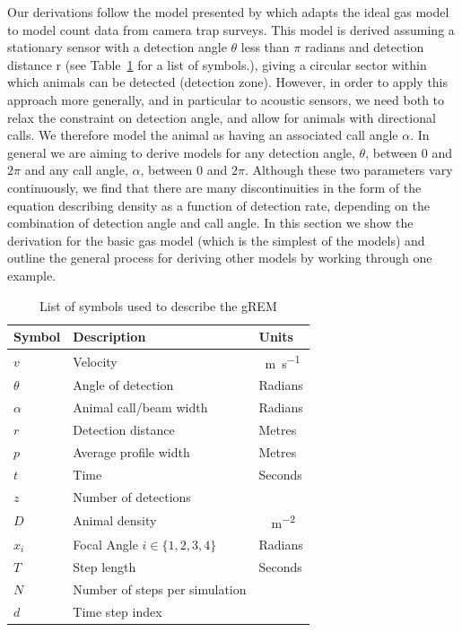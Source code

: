\documentclass[a4paper,10pt,reqno,oneside]{amsart}
\begin{document}
Our derivations follow the model presented by \cite{rowcliffe2008estimating} which adapts the ideal gas model to model count data from camera trap surveys. This model is derived assuming a stationary sensor with a detection angle $\theta$ less than $\pi$ radians and detection distance r (see Table~\ref{t:paras} for a list of symbols.), giving a circular sector within which animals can be detected (detection zone). However, in order to apply this approach more generally, and in particular to acoustic sensors, we need both to relax the constraint on detection angle, and allow for animals with directional calls. We therefore model the animal as having an associated call angle $\alpha$. In general we are aiming to derive models for any detection angle, $ \theta$, between 0 and $2\pi$ and any call angle, $ \alpha$, between 0 and $2\pi$. Although these two parameters vary continuously, we find that there are many discontinuities in the form of the equation describing density as a function of detection rate, depending on the combination of detection angle and call angle. In this section we show the derivation for the basic gas model (which is the simplest of the models) and outline the general process for deriving other models by working through one example. 



\begin{table}[t]
\centering
\begin{tabular}{lll}
Symbol 	& Description & Units\\\hline
$v$		& Velocity & \SI{}{\meter\per\second}\\
$\theta$	& Angle of detection & Radians \\
$\alpha$	& Animal call/beam width & Radians \\
$r$ 		& Detection distance & Metres\\
$p$ 		& Average profile width & Metres\\
$t$		& Time & Seconds\\
$z$		& Number of detections & \\
$D$		& Animal density & \SI{}{\animals\per\meter\squared} \\
$x_i$	        & Focal Angle $i \in \{1,2,3,4\} $ 	& Radians\\
$T$ 		& Step length & Seconds\\
$N$ 		& Number of steps per simulation & \\
$d$ 		& Time step index &

\end{tabular}
\caption{List of symbols used to describe the gREM}
\label{t:paras}
\end{table}
\end{document}
